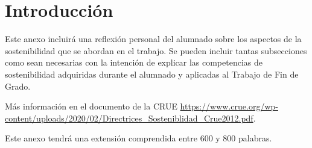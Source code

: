 
\section{Introducción}
Este anexo incluirá una reflexión personal del alumnado sobre los aspectos de la sostenibilidad que se abordan en el trabajo.
Se pueden incluir tantas subsecciones como sean necesarias con la intención de explicar las competencias de sostenibilidad adquiridas durante el alumnado y aplicadas al Trabajo de Fin de Grado.

Más información en el documento de la CRUE \url{https://www.crue.org/wp-content/uploads/2020/02/Directrices_Sosteniblidad_Crue2012.pdf}.

Este anexo tendrá una extensión comprendida entre 600 y 800 palabras.
